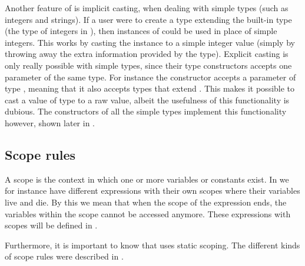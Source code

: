 Another feature of \productname{} is implicit casting, when dealing with simple
types (such as integers and strings). If a user were to create a type
 extending the built-in type  (the type of
integers in \productname{}), then instances of  could be used in
place of simple integers. This works by casting the instance to a simple integer
value (simply by throwing away the extra information provided by the
 type). Explicit casting is only really possible with simple
types, since their type constructors accepts one parameter of the same type. For
instance the constructor  accepts a parameter of type
, meaning that it also accepts types that extend .
This makes it possible to cast a value of type  to a raw
 value, albeit the usefulness of this functionality is dubious.
The constructors of all the simple types implement this functionality however, 
shown later in .

\subsection*{Scope rules}

A scope is the context in which one or more variables or constants exist. In
\productname{} we for instance have different expressions with their own scopes
where their variables live and die. By this we mean that when the scope of the
expression ends, the variables within the scope cannot be accessed anymore.
These expressions with scopes will be defined in .

Furthermore, it is important to know that \productname{} uses static scoping.
The different kinds of scope rules were described in .








